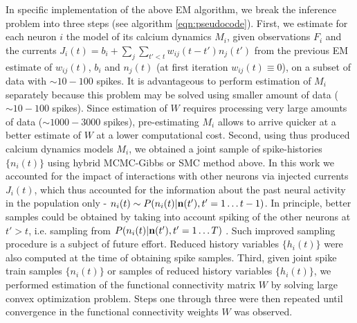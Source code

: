 In specific implementation of the above EM algorithm, we break the inference problem into three steps (see algorithm \ref{eqn:pseudocode}).  First, we estimate for each neuron $i$ the model of its calcium dynamics $M_i$, given observations $F_i$ and the currents $J_i(t)=b_i+\sum_{j}\sum_{t'<t}w_{ij}(t-t')n_{j}(t')$ from the previous EM estimate of $w_{ij}(t)$, $b_i$ and $n_{j}(t)$ (at first iteration $w_{ij}(t) \equiv 0$), on a subset of data with $\sim 10-100$ spikes.  It is advantageous to perform estimation of $M_i$ separately because this problem may be solved using smaller amount of data ($\sim 10-100$ spikes). Since estimation of $W$ requires processing very large amounts of data ($\sim 1000-3000$ spikes), pre-estimating $M_i$ allows to arrive quicker at a better estimate of $W$ at a lower computational cost.  Second, using thus produced calcium dynamics models $M_i$, we obtained a joint sample of spike-histories $\{ n_i(t)\}$ using hybrid MCMC-Gibbs or SMC method above.  In this work we accounted for the impact of interactions with other neurons via injected currents $J_i(t)$, which thus accounted for the information about the past neural activity in the population only - $n_i(t) \sim P(n_i(t)|{\bf n}(t'), {t'=1\ldots t-1})$. In principle, better samples could be obtained by taking into account spiking of the other neurons at $t'>t$, i.e. sampling from $P(n_i(t)|{\bf n}(t'), {t'=1\ldots T})$ \cite{PL07}. Such improved sampling procedure is a subject of future effort.  Reduced history variables $\{h_i(t)\}$ were also computed at the time of obtaining spike samples.  Third, given joint spike train samples $\{ n_i(t)\}$ or samples of reduced history variables $\{ h_i(t)\}$, we performed estimation of the functional connectivity matrix $W$ by solving large convex optimization problem.  Steps one through three were then repeated until convergence in the functional connectivity weights $W$ was observed.

